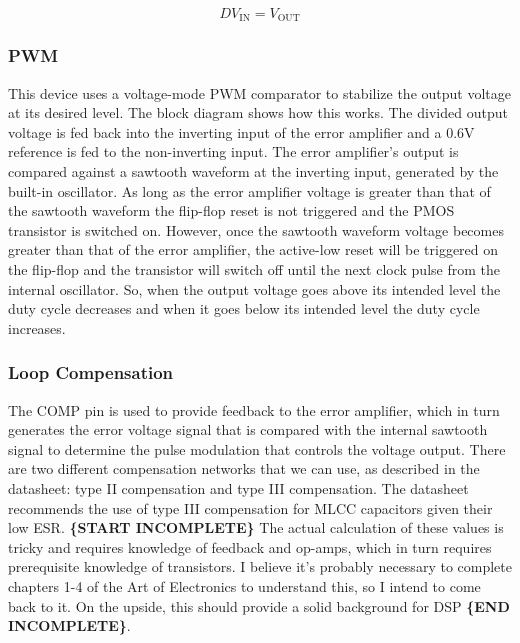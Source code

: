 \begin{equation} DV_{\text{IN}} = V_{\text{OUT}}
        \label{eq:duty-cycle}
\end{equation}

\subsubsection{PWM}
\label{sec:l7980-pwm}

This device uses a voltage-mode PWM comparator to stabilize the output voltage at its desired
level. The block diagram shows how this works. The divided output voltage is fed back into the
inverting input of the error amplifier and a 0.6V reference is fed to the non-inverting input. The
error amplifier's output is compared against a sawtooth waveform at the inverting input, generated
by the built-in oscillator. As long as the error amplifier voltage is greater than that of the
sawtooth waveform the flip-flop reset is not triggered and the PMOS transistor is switched
on. However, once the sawtooth waveform voltage becomes greater than that of the error amplifier,
the active-low reset will be triggered on the flip-flop and the transistor will switch off until the
next clock pulse from the internal oscillator. So, when the output voltage goes above its intended
level the duty cycle decreases and when it goes below its intended level the duty cycle increases.

\subsubsection{Loop Compensation}
\label{sec:l7980-loop-compensation}

The COMP pin is used to provide feedback to the error amplifier, which in turn generates the error
voltage signal that is compared with the internal sawtooth signal to determine the pulse modulation
that controls the voltage output. There are two different compensation networks that we can use, as
described in the datasheet: type II compensation and type III compensation. The datasheet recommends
the use of type III compensation for MLCC capacitors given their low ESR. \textbf{\{START
  INCOMPLETE\}} The actual calculation of these values is tricky and requires knowledge of feedback
and op-amps, which in turn requires prerequisite knowledge of transistors. I believe it's probably
necessary to complete chapters 1-4 of the Art of Electronics to understand this, so I intend to come
back to it. On the upside, this should provide a solid background for DSP \textbf{\{END
  INCOMPLETE\}}.

